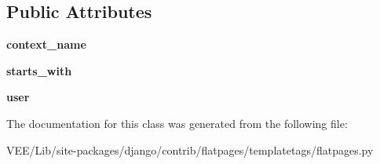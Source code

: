 \subsection*{Public Attributes}
\begin{DoxyCompactItemize}
\item 
\mbox{\label{classdjango_1_1contrib_1_1flatpages_1_1templatetags_1_1flatpages_1_1_flatpage_node_a4d8bda37ce6bb42745dec89768a3d0c9}} 
{\bfseries context\+\_\+name}
\item 
\mbox{\label{classdjango_1_1contrib_1_1flatpages_1_1templatetags_1_1flatpages_1_1_flatpage_node_a0d57d754f36250c09b1be2f64c792845}} 
{\bfseries starts\+\_\+with}
\item 
\mbox{\label{classdjango_1_1contrib_1_1flatpages_1_1templatetags_1_1flatpages_1_1_flatpage_node_a82ca6f97bcc5a830a1487c297ba04dcd}} 
{\bfseries user}
\end{DoxyCompactItemize}


The documentation for this class was generated from the following file\+:\begin{DoxyCompactItemize}
\item 
V\+E\+E/\+Lib/site-\/packages/django/contrib/flatpages/templatetags/flatpages.\+py\end{DoxyCompactItemize}
